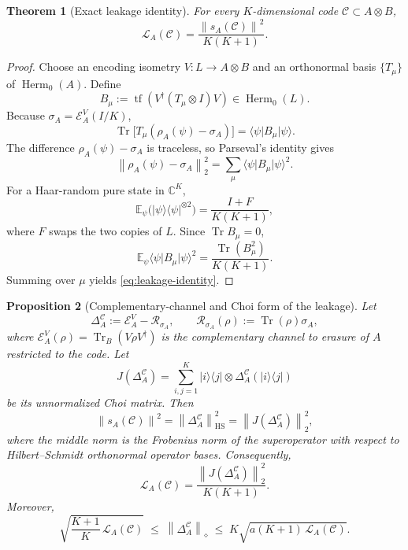 \documentclass[11pt]{article}
\newtheorem{theorem}{Theorem}[section]
\newtheorem{proposition}[theorem]{Proposition}
\theoremstyle{definition}
\newcommand{\cC}{\mathcal C}
\newcommand{\cL}{\mathcal L}
\newcommand{\cE}{\mathcal E}
\newcommand{\cR}{\mathcal R}
\newcommand{\Herm}{\operatorname{Herm}}
\newcommand{\Tr}{\operatorname{Tr}}
\newcommand{\tf}{\operatorname{tf}}
\newcommand{\C}{\mathbb C}
\newcommand{\1}{\mathbf 1}
\newcommand{\ket}[1]{\lvert #1\rangle}
\newcommand{\bra}[1]{\langle #1\rvert}
\newcommand{\norm}[1]{\left\lVert #1\right\rVert}
\begin{document}
\begin{theorem}[Exact leakage identity]
\label{thm:leakage}
For every $K$-dimensional code $\cC\subset A\otimes B$,
\begin{equation}
\boxed{
\cL_A(\cC)
=
\frac{\norm{s_A(\cC)}^2}{K(K+1)}.
}
\label{eq:leakage-identity}
\end{equation}
\end{theorem}

\begin{proof}
Choose an encoding isometry $V:L\to A\otimes B$ and an orthonormal basis $\{T_\mu\}$ of $\Herm_0(A)$.  Define
\[
B_\mu
:=\tf\!\left(V^\dagger(T_\mu\otimes I)V\right)
\in\Herm_0(L).
\]
Because $\sigma_A=\cE_A^V(I/K)$,
\[
\Tr\bigl[T_\mu(\rho_A(\psi)-\sigma_A)\bigr]
=\bra{\psi}B_\mu\ket{\psi}.
\]
The difference $\rho_A(\psi)-\sigma_A$ is traceless, so Parseval's identity gives
\[
\norm{\rho_A(\psi)-\sigma_A}_2^2
=\sum_\mu\bra{\psi}B_\mu\ket{\psi}^2.
\]
For a Haar-random pure state in $\C^K$,
\[
\mathbb E_{\psi}\bigl(\ket{\psi}\bra{\psi}^{\otimes 2}\bigr)
=\frac{I+F}{K(K+1)},
\]
where $F$ swaps the two copies of $L$.  Since $\Tr B_\mu=0$,
\[
\mathbb E_{\psi}\bra{\psi}B_\mu\ket{\psi}^2
=\frac{\Tr(B_\mu^2)}{K(K+1)}.
\]
Summing over $\mu$ yields \eqref{eq:leakage-identity}.
\end{proof}


\begin{proposition}[Complementary-channel and Choi form of the leakage]
\label{prop:choi-leakage}
Let
\[
\Delta_A^{\cC}
:=\cE_A^V-\cR_{\sigma_A},
\qquad
\cR_{\sigma_A}(\rho):=\Tr(\rho)\sigma_A,
\]
where $\cE_A^V(\rho)=\Tr_B(V\rho V^\dagger)$ is the complementary channel to erasure of $A$ restricted to the code.  Let
\[
J(\Delta_A^{\cC})
=\sum_{i,j=1}^K
\ket{i}\bra{j}\otimes
\Delta_A^{\cC}(\ket{i}\bra{j})
\]
be its unnormalized Choi matrix.  Then
\begin{equation}
\boxed{
\norm{s_A(\cC)}^2
=
\norm{\Delta_A^{\cC}}_{\mathrm{HS}}^2
=
\norm{J(\Delta_A^{\cC})}_2^2,
}
\label{eq:choi-section}
\end{equation}
where the middle norm is the Frobenius norm of the superoperator with respect to Hilbert--Schmidt orthonormal operator bases.  Consequently,
\begin{equation}
\boxed{
\cL_A(\cC)
=
\frac{\norm{J(\Delta_A^{\cC})}_2^2}{K(K+1)}.
}
\label{eq:choi-leakage}
\end{equation}
Moreover,
\begin{equation}
\sqrt{\frac{K+1}{K}\,\cL_A(\cC)}
\;\le\;
\norm{\Delta_A^{\cC}}_\diamond
\;\le\;
K\sqrt{a(K+1)\,\cL_A(\cC)}.
\label{eq:diamond-sandwich}
\end{equation}
\end{proposition}
\end{document}
